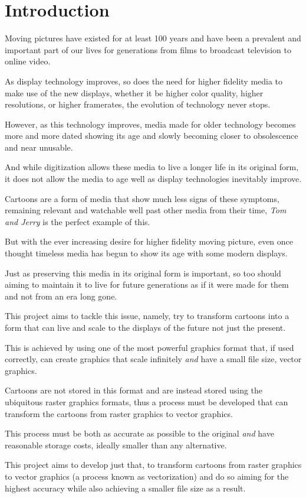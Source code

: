\documentclass[12pt]{article}
\newcommand{\sentence}{} %
\newcommand{\italic}[1]{\textit{#1}}
\begin{document}


    \section{Introduction}\label{sec:introduction}

    \tab
    Moving pictures have existed for at least 100 years and have been a prevalent and important part of our lives for
    generations from films to broadcast television to online video.
    \sentence
    As display technology improves, so does the need for higher fidelity media to make use of the new displays,
    whether it be higher color quality, higher resolutions, or higher framerates, the evolution of technology never
    stops.
    \sentence
    However, as this technology improves, media made for older technology becomes more and more dated showing its age
    and slowly becoming closer to obsolescence and near unusable.
    \sentence
    And while digitization allows these media to live a longer life in its original form, it does not allow the media
    to age well as display technologies inevitably improve.
    \sentence
    Cartoons are a form of media that show much less signs of these symptoms, remaining relevant and watchable well
    past other media from their time, \italic{Tom and Jerry} is the perfect example of this.
    \sentence
    But with the ever increasing desire for higher fidelity moving picture, even once thought timeless media has
    begun to show its age with some modern displays.
    \sentence
    Just as preserving this media in its original form is important, so too should aiming to maintain it to live for
    future generations as if it were made for them and not from an era long gone.

    \bigskip
    This project aims to tackle this issue, namely, try to transform cartoons into a form that can live and scale to
    the displays of the future not just the present.
    \sentence
    This is achieved by using one of the most powerful graphics format that, if used correctly, can create graphics that
    scale infinitely \italic{and} have a small file size, vector graphics.
    \sentence
    Cartoons are not stored in this format and are instead stored using the ubiquitous raster graphics formats, thus
    a process must be developed that can transform the cartoons from raster graphics to vector graphics.
    \sentence
    This process must be both as accurate as possible to the original \italic{and} have reasonable storage costs,
    ideally smaller than any alternative.
    \sentence
    This project aims to develop just that, to transform cartoons from raster graphics to vector graphics (a process
    known as vectorization) and do so aiming for the highest accuracy while also achieving a smaller file size as a
    result.
\end{document}

